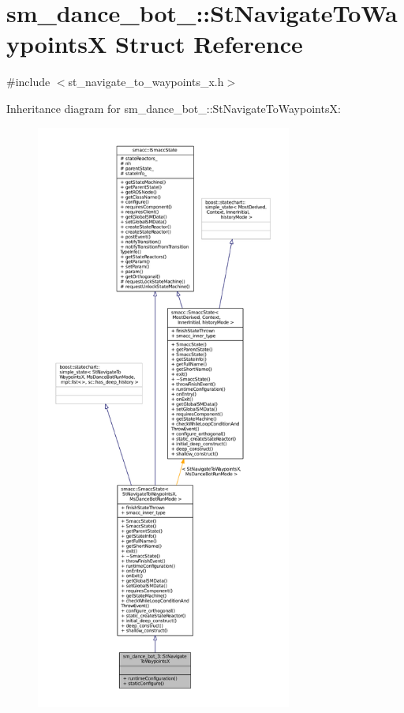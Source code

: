 \hypertarget{structsm__dance__bot__3_1_1StNavigateToWaypointsX}{}\section{sm\+\_\+dance\+\_\+bot\+\_\+:\+:St\+Navigate\+To\+WaypointsX Struct Reference}
\label{structsm__dance__bot__3_1_1StNavigateToWaypointsX}


{\ttfamily \#include $<$st\+\_\+navigate\+\_\+to\+\_\+waypoints\+\_\+x.\+h$>$}



Inheritance diagram for sm\+\_\+dance\+\_\+bot\+\_\+:\+:St\+Navigate\+To\+WaypointsX\+:
\nopagebreak
\begin{figure}[H]
\begin{center}
\leavevmode
\includegraphics[height=550pt]{structsm__dance__bot__3_1_1StNavigateToWaypointsX__inherit__graph}
\end{center}
\end{figure}


